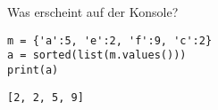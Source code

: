 \question[2] Was erscheint auf der Konsole?
\begin{lstlisting}
m = {'a':5, 'e':2, 'f':9, 'c':2}
a = sorted(list(m.values()))
print(a)
\end{lstlisting}
\begin{solutionbox}{2cm}
\begin{lstlisting}
[2, 2, 5, 9]
\end{lstlisting}
\end{solutionbox}
